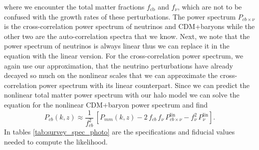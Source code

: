 \documentclass[../main.tex]{subfiles}
\begin{document}
where we encounter the total matter fractions $f_\mathrm{cb}$ and $f_\nu$, which are not to be confused with the growth rates of these perturbations. The power spectrum $P_{cb\times\nu}$ is the cross-correlation power spectrum of neutrinos and CDM+baryons while the other two are the auto-correlation spectra that we know. Next, we note that the power spectrum of neutrinos is always linear thus we can replace it in the equation with the linear version. For the cross-correlation power spectrum, we again use our approximation, that the neutrino perturbations have already decayed so much on the nonlinear scales that we can approximate the cross-correlation power spectrum with its linear counterpart. Since we can predict the nonlinear total matter power spectrum with our halo model we can solve the equation for the nonlinear CDM+baryon power spectrum and find 
\begin{equation}
    P_{cb}(k,z) \approx \frac{1}{f_{cb}^2}\,\left[P_{mm}(k,z)-2\,f_{cb}\,f_\nu\,P^\mathrm{lin}_{cb\times\nu}-f_{\nu}^2\,P^\mathrm{lin}_{\nu}\right].
\end{equation}   
In tables \ref{tab:survey_spec_photo} are the specifications and fiducial values needed to compute the likelihood.
\end{document}
